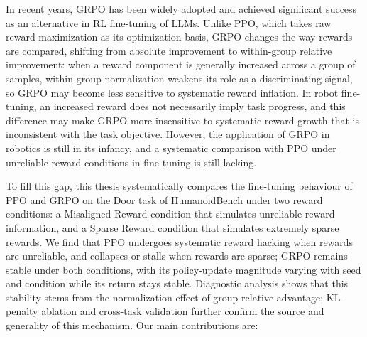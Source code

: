 In recent years, GRPO has been widely adopted and achieved significant success as an alternative in RL fine-tuning of LLMs\cite{shao2024deepseekmath}. Unlike PPO, which takes raw reward maximization as its optimization basis, GRPO changes the way rewards are compared, shifting from absolute improvement to within-group relative improvement: when a reward component is generally increased across a group of samples, within-group normalization weakens its role as a discriminating signal, so GRPO may become less sensitive to systematic reward inflation\cite{yao2026multimodal}. In robot fine-tuning, an increased reward does not necessarily imply task progress, and this difference may make GRPO more insensitive to systematic reward growth that is inconsistent with the task objective. However, the application of GRPO in robotics is still in its infancy, and a systematic comparison with PPO under unreliable reward conditions in fine-tuning is still lacking.

To fill this gap, this thesis systematically compares the fine-tuning behaviour of PPO and GRPO on the Door task of HumanoidBench\cite{sferrazza2024humanoidbench} under two reward conditions: a Misaligned Reward condition that simulates unreliable reward information, and a Sparse Reward condition that simulates extremely sparse rewards. We find that PPO undergoes systematic reward hacking when rewards are unreliable, and collapses or stalls when rewards are sparse; GRPO remains stable under both conditions, with its policy-update magnitude varying with seed and condition while its return stays stable. Diagnostic analysis shows that this stability stems from the normalization effect of group-relative advantage; KL-penalty ablation and cross-task validation further confirm the source and generality of this mechanism. Our main contributions are:

